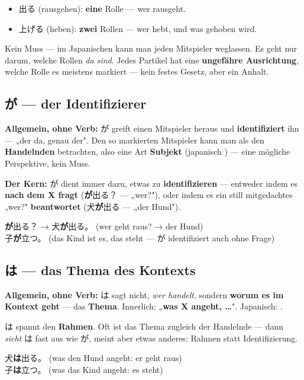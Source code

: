 \documentclass[11pt,a4paper,DIV=12]{scrartcl}
\begin{document}
\begin{itemize}[leftmargin=1.5em]
\item 出る (rausgehen): \textbf{eine} Rolle — wer rausgeht.
\item 上げる (heben): \textbf{zwei} Rollen — wer hebt, und was gehoben wird.
\end{itemize}

Kein Muss — im Japanischen kann man jeden Mitspieler weglassen. Es geht nur darum,
welche Rollen \emph{da sind}. Jedes Partikel hat eine \textbf{ungefähre Ausrichtung},
welche Rolle es meistens markiert — kein festes Gesetz, aber ein Anhalt.

\subsection*{が — der Identifizierer}

\textbf{Allgemein, ohne Verb:} が greift einen Mitspieler heraus und
\textbf{identifiziert} ihn — „der da, genau der". Den so markierten Mitspieler kann
man als den \textbf{Handelnden} betrachten, also eine Art \textbf{Subjekt} (japanisch
) — eine mögliche Perspektive, kein Muss.

\textbf{Der Kern:} が dient immer dazu, etwas zu \textbf{identifizieren} — entweder
indem es \textbf{nach dem X fragt} (\textbf{が}出る？ — „wer?"), oder
indem es ein still mitgedachtes „wer?" \textbf{beantwortet} (犬\textbf{が}出る — „der
Hund").

\textbf{が}出る？ → 犬\textbf{が}出る。 (wer geht raus? → der Hund) \\
子\textbf{が}立つ。 (das Kind ist es, das steht — が identifiziert auch ohne Frage)

\subsection*{は — das Thema des Kontexts}

\textbf{Allgemein, ohne Verb:} は sagt nicht, \emph{wer handelt}, sondern
\textbf{worum es im Kontext geht} — das \textbf{Thema}. Innerlich: „\textbf{was X
angeht, …}". Japanisch: .

は spannt den \textbf{Rahmen}. Oft ist das Thema zugleich der Handelnde — dann
\emph{sieht} は fast aus wie が, meint aber etwas anderes: Rahmen statt Identifizierung.

犬\textbf{は}出る。 (was den Hund angeht: er geht raus) \\
子\textbf{は}立つ。 (was das Kind angeht: es steht)
\end{document}
